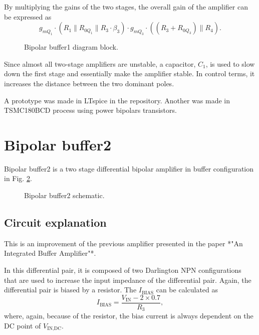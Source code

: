 \documentclass[12pt]{article}
\begin{document}
By multiplying the gains of the two stages, the overall gain of the amplifier can be expressed as  
\[
g_{mQ_1} \cdot \left( R_1 \parallel R_{0Q_1} \parallel R_3 \cdot \beta_3 \right) \cdot g_{mQ_3} \cdot \left( (R_3 + R_{0Q_3}) \parallel R_4 \right).
\]  



\begin{figure}[H]
        \centering
        
        \caption{Bipolar buffer1  diagram block.}
        \label{bipolarbuffer01dig}
\end{figure}








Since almost all two-stage amplifiers are unstable, a capacitor, $C_1$, is used to slow down the first stage and essentially make the amplifier stable. In control terms, it increases the distance between the two dominant poles.


A prototype was made in LTspice in the repository. Another was made in TSMC180BCD process using power bipolars transistors.






\newpage

\section{Bipolar buffer2}



Bipolar buffer2 is a two stage differential bipolar amplifier in buffer configuration in Fig. \ref{bipolarbuffer02}. 

\begin{figure}[H]
        \centering
        
        \caption{Bipolar buffer2  schematic.}
        \label{bipolarbuffer02}
\end{figure}

\subsection{Circuit explanation}

This is an improvement of the previous amplifier presented in the paper *"An Integrated Buffer Amplifier"*.  

In this differential pair, it is composed of two Darlington NPN configurations that are used to increase the input impedance of the differential pair. Again, the differential pair is biased by a resistor. The $I_{\text{BIAS}}$ can be calculated as  
\[
I_{\text{BIAS}} = \frac{V_{\text{IN}} - 2 \times 0.7}{R_3},
\]  
where, again, because of the resistor, the bias current is always dependent on the DC point of $V_{\text{IN,DC}}$.  
\end{document}
